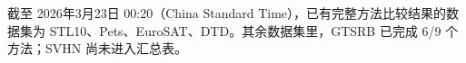 截至 2026年3月23日 00:20（China Standard Time），已有完整方法比较结果的数据集为 STL10、Pets、EuroSAT、DTD。其余数据集里，GTSRB 已完成 6/9 个方法；SVHN 尚未进入汇总表。
